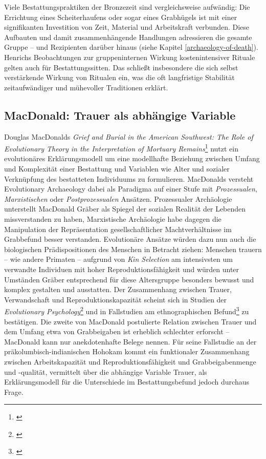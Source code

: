\documentclass[openany,twoside,twocolumn]{book}
\let\rmarkdownfootnote\footnote%
\def\footnote{\protect\rmarkdownfootnote}
\begin{document}
Viele Bestattungspraktiken der Bronzezeit sind vergleichsweise
aufwändig: Die Errichtung eines Scheiterhaufens oder sogar eines
Grabhügels ist mit einer signifikanten Investition von Zeit, Material
und Arbeitskraft verbunden. Diese Aufbauten und damit zusammenhängende
Handlungen adressieren die gesamte Gruppe -- und Rezipienten darüber
hinaus (siehe Kapitel \ref{archaeology-of-death}). Henrichs
Beobachtungen zur gruppeninternen Wirkung kostenintensiver Rituale
gelten auch für Bestattungssitten. Das schließt insbesondere die sich
selbst verstärkende Wirkung von Ritualen ein, was die oft langfristige
Stabilität zeitaufwändiger und mühevoller Traditionen erklärt.

\hypertarget{macdonald-trauer-als-abhangige-variable}{%
\subsection{MacDonald: Trauer als abhängige
Variable}\label{macdonald-trauer-als-abhangige-variable}}

Douglas MacDonalds \emph{Grief and Burial in the American Southwest: The
Role of Evolutionary Theory in the Interpretation of Mortuary
Remains}\footnote{\textcite{macdonald_grief_2001}} nutzt ein
evolutionäres Erklärungsmodell um eine modellhafte Beziehung zwischen
Umfang und Komplexität einer Bestattung und Variablen wie Alter und
sozialer Verknüpfung des bestatteten Individuums zu formulieren.
MacDonalds versteht Evolutionary Archaeology dabei als Paradigma auf
einer Stufe mit \emph{Prozessualen}, \emph{Marxistischen} oder
\emph{Postprozessualen} Ansätzen. Prozessualer Archäologie unterstellt
MacDonald Gräber als Spiegel der sozialen Realität der Lebenden
missverstanden zu haben, Marxistische Archäologie habe dagegen die
Manipulation der Repräsentation gesellschaftlicher Machtverhältnisse im
Grabbefund besser verstanden. Evolutionäre Ansätze würden dazu nun auch
die biologischen Prädispositionen des Menschen in Betracht ziehen:
Menschen trauern -- wie andere Primaten -- aufgrund von \emph{Kin
Selection} am intensivsten um verwandte Individuen mit hoher
Reproduktionsfähigkeit und würden unter Umständen Gräber entsprechend
für diese Altersgruppe besonders bewusst und komplex gestalten und
ausstatten. Der Zusammenhang zwischen Trauer, Verwandschaft und
Reproduktionskapazität scheint sich in Studien der \emph{Evolutionary
Psychology}\footnote{\textcite{segal_grief_1993}} und in Fallstudien am
ethnographischen Befund\footnote{\textcite{crawford_human_1989}} zu
bestätigen. Die zweite von MacDonald postulierte Relation zwischen
Trauer und dem Umfang etwa von Grabbeigaben ist erheblich schlechter
erforscht -- MacDonald kann nur anekdotenhafte Belege nennen. Für seine
Fallstudie an der präkolumbisch-indianischen Hohokam kommt ein
funktionaler Zusammenhang zwischen Arbeitskapazität und
Reproduktionsfähigkeit und Grabbeigabenmenge und -qualität, vermittelt
über die abhängige Variable Trauer, als Erklärungsmodell für die
Unterschiede im Bestattungsbefund jedoch durchaus Frage.
\end{document}
